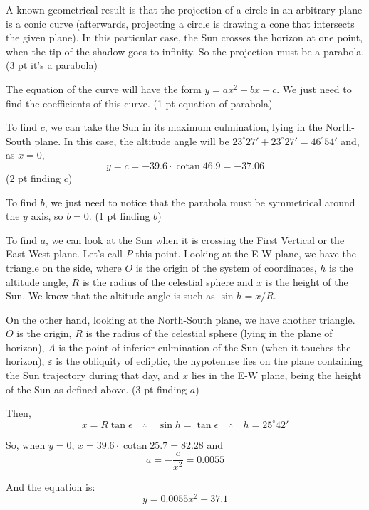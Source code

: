 A known geometrical result is that the projection of a circle in an arbitrary
plane is a conic curve (afterwards, projecting a circle is drawing a cone that
intersects the given plane). In this particular case, the Sun crosses the
horizon at one point, when the tip of the shadow goes to infinity. So the
projection must be a parabola.
\hfill(3 pt it's a parabola)

The equation of the curve will have the form $y = ax^2 + bx + c$. We just
need to find the coefficients of this curve.
\hfill(1 pt equation of parabola)

To find $c$, we can take the Sun in its maximum culmination, lying in the
North-South plane. In this case, the altitude angle will be
$23^\circ 27' + 23^\circ 27' = 46^\circ 54'$ and, as $x = 0$,
\[
  y = c = -39.6 \cdot \operatorname{cotan} 46.9 = -37.06
\]
\hfill(2 pt finding $c$)

To find $b$, we just need to notice that the parabola must be symmetrical
around the $y$ axis, so $b = 0$.
\hfill(1 pt finding $b$)


To find $a$, we can look at the Sun when it is crossing the First Vertical or
the East-West plane. Let's call $P$ this point. Looking at the E-W plane, we
have the triangle on the side, where $O$ is the origin of the system of
coordinates, $h$ is the altitude angle, $R$ is the radius of the celestial
sphere and $x$ is the height of the Sun. We know that the altitude angle is
such as $\sin h = x/R$.


On the other hand, looking at the North-South plane, we have another
triangle. $O$ is the origin, $R$ is the radius of the celestial sphere (lying
in the plane of horizon), $A$ is the point of inferior culmination of the Sun
(when it touches the horizon), $\varepsilon$ is the obliquity of ecliptic,
the hypotenuse lies on the plane containing the Sun trajectory during that
day, and $x$ lies in the E-W plane, being the height of the Sun as defined
above.
\hfill(3 pt finding $a$)

Then,
\[
  x = R\tan\epsilon \quad\therefore\quad \sin h = \tan\epsilon
  \quad\therefore\quad h = 25^\circ 42'
\]

So, when $y = 0$, $x = 39.6 \cdot \operatorname{cotan} 25.7 = 82.28$ and
\[
  a = -\frac{c}{x^2} = 0.0055
\]

And the equation is:
\[
  y = 0.0055x^2 - 37.1
\]
